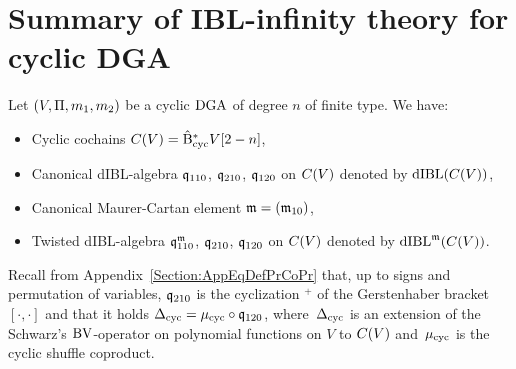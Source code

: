 \documentclass[\MainFolder/Text.tex]{subfiles}
\begin{document}
\section{Summary of IBL-infinity theory for cyclic DGA}\label{BV:Summary}
Let $(V,\Pi,m_1,m_2)$ be a cyclic $\mathrm{DGA}$ of degree $n$ of finite type.
We have:
\begin{itemize}
    \item Cyclic cochains $C(V) = \hat{\mathrm{B}}_{\mathrm{cyc}}^* V[2-n]$,
    \item Canonical dIBL-algebra $\mathfrak{q}_{110}$, $\mathfrak{q}_{210}$, $\mathfrak{q}_{120}$ on $C(V)$ denoted by $\mathrm{dIBL}(C(V))$,
    \item Canonical Maurer-Cartan element $\mathfrak{m} = (\mathfrak{m}_{10})$,
    \item Twisted dIBL-algebra $\mathfrak{q}_{110}^{\mathfrak{m}}$, $\mathfrak{q}_{210}$, $\mathfrak{q}_{120}$ on $C(V)$ denoted by $\mathrm{dIBL}^{\mathfrak{m}}(C(V))$.
\end{itemize}
Recall from Appendix~\ref{Section:AppEqDefPrCoPr} that, up to signs and permutation of variables, $\mathfrak{q}_{210}$ is the cyclization ${}^+$ of the Gerstenhaber bracket $[\cdot,\cdot]$ and that it holds $\operatorname{\Delta}_{\mathrm{cyc}} = \mu_{\mathrm{cyc}}\circ\mathfrak{q}_{120}$, where~$\operatorname{\Delta}_{\mathrm{cyc}}$ is an extension of the Schwarz's $\mathrm{BV}$-operator on polynomial functions on $V$ to $C(V)$ and~$\mu_{\mathrm{cyc}}$ is the cyclic shuffle coproduct. 
\end{document}
